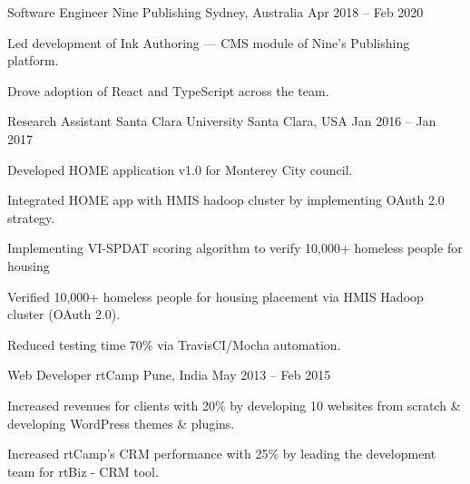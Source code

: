 \begin{cventries}
  \cventry
    {Software Engineer} %
    {Nine Publishing} %
    {Sydney, Australia} %
    {Apr 2018 -- Feb 2020} %
    {
      \begin{cvitems}
        \item {Led development of Ink Authoring --- CMS module of Nine's Publishing platform.}
        \item {Drove adoption of React and TypeScript across the team.}
      \end{cvitems}
    }


  \cventry
    {Research Assistant} %
    {Santa Clara University} %
    {Santa Clara, USA} %
    {Jan 2016 -- Jan 2017} %
    {
      \begin{cvitems}
        \item {Developed HOME application v1.0 for Monterey City council.}
        \item {Integrated HOME app with HMIS hadoop cluster by implementing OAuth 2.0 strategy.}
        \item {Implementing VI-SPDAT scoring algorithm to verify 10,000+ homeless people for housing}
        \item {Verified 10,000+ homeless people for housing placement via HMIS Hadoop cluster (OAuth 2.0).}
        \item {Reduced testing time 70\% via TravisCI/Mocha automation.}
      \end{cvitems}
    }

  \cventry
    {Web Developer} %
    {rtCamp} %
    {Pune, India} %
    {May 2013 -- Feb 2015} %
    {
      \begin{cvitems}
        \item {Increased revenues for clients with 20\% by developing 10 websites from scratch \& developing WordPress themes \& plugins.}
        \item {Increased rtCamp's CRM performance with 25\% by leading the development team for rtBiz - CRM tool.}
      \end{cvitems}
    }

\end{cventries}
